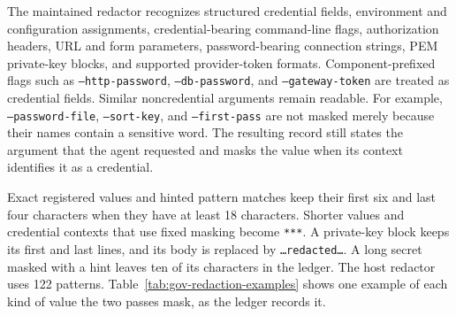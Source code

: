 The maintained redactor recognizes structured credential fields, environment and configuration assignments, credential-bearing command-line flags, authorization headers, URL and form parameters, password-bearing connection strings, PEM private-key blocks, and supported provider-token formats. Component-prefixed flags such as
\texttt{--http-password}, \texttt{--db-password}, and
\texttt{--gateway-token} are treated as credential fields. Similar noncredential arguments remain readable. For example,
\texttt{--password-file}, \texttt{--sort-key}, and
\texttt{--first-pass} are not masked merely because their names contain a sensitive word. The resulting record still states the argument that the agent requested and masks the value when its context identifies it as a credential.

{\color{red}Exact registered values and hinted pattern matches keep their first six
and last four characters when they have at least 18 characters. Shorter values
and credential contexts that use fixed masking become \texttt{***}. A private-key block keeps its first and last lines,
and its body is replaced by \texttt{\ldots{}redacted\ldots{}}. A long secret
masked with a hint leaves ten of its characters in the ledger. The host redactor uses
122 patterns. Table~\ref{tab:gov-redaction-examples} shows one example of each
kind of value the two passes mask, as the ledger records it.}

